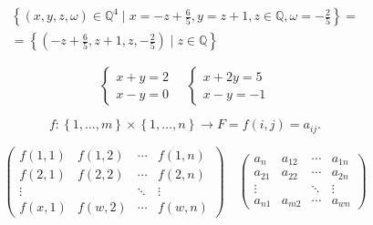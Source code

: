 \[
  \begin{array}{l}
    \left\{(x, y, z, \omega) \in \mathbb{Q}^{4} \mid x=-z+\frac{6}{5}, y=z+1, z \in \mathbb{Q}, \omega=-\frac{2}{5}\right\}= \\
    =\left\{\left(-z+\frac{6}{5}, z+1, z,-\frac{2}{5}\right) \mid z \in \mathbb{Q}\right\}
  \end{array}
\]

\[
  \left\{\begin{array}{l}
    x+y=2 \\
    x-y=0
  \end{array} \quad\left\{\begin{array}{l}
    x+2 y=5 \\
    x-y=-1
  \end{array}\right.\right.
\]

\[
  f\colon
  \left\{1,\ldots,m\right\}\times
  \left\{1,\ldots,n\right\}\rightarrow
  F=f\left(i,j\right)=a_{ij}.
\]

\[
  \begin{pmatrix}
    f\left(1,1\right) & f\left(1,2\right) & \cdots & f\left(1,n\right) \\
    f\left(2,1\right) & f\left(2,2\right) & \cdots & f\left(2,n\right) \\
    \vdots            &                   & \ddots & \vdots            \\
    f\left(x,1\right) & f\left(w,2\right) & \cdots & f\left(w,n\right)
  \end{pmatrix}\quad
  \begin{pmatrix}
    a_{n}   & a_{12}  & \cdots & a_{1 n} \\
    a_{21}  & a_{22}  & \cdots & a_{2 n} \\
    \vdots  &         & \ddots & \vdots  \\
    a_{n 1} & a_{m 2} & \cdots & a_{w n}
  \end{pmatrix}
\]